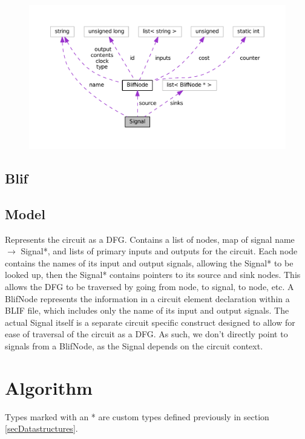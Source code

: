 \documentclass[12pt,final,oneside]{article} %
\begin{document}
   \begin{figure}
      \includegraphics{doxygen/classSignal__coll__graph.pdf}
   \end{figure}

   \subsection{Blif}
      
   \subsection{Model}
      Represents the circuit as a DFG. Contains a list of nodes, map of signal name $\to$ Signal*, and lists of primary inputs and outputs for the circuit.
      Each node contains the names of its input and output signals, allowing the Signal* to be looked up, then the Signal* contains pointers to its source and sink nodes.
      This allows the DFG to be traversed by going from node, to signal, to node, etc.
      A BlifNode represents the information in a circuit element declaration within a \ac{BLIF} file, which includes only the name of its input and output signals. The actual Signal itself is a separate circuit specific construct designed to allow for ease of traversal of the circuit as a \ac{DFG}.
      As such, we don't directly point to signals from a BlifNode, as the Signal depends on the circuit context.

\newpage
\section{Algorithm}
Types marked with an * are custom types defined previously in section \ref{secDatastructures}.
\end{document}
